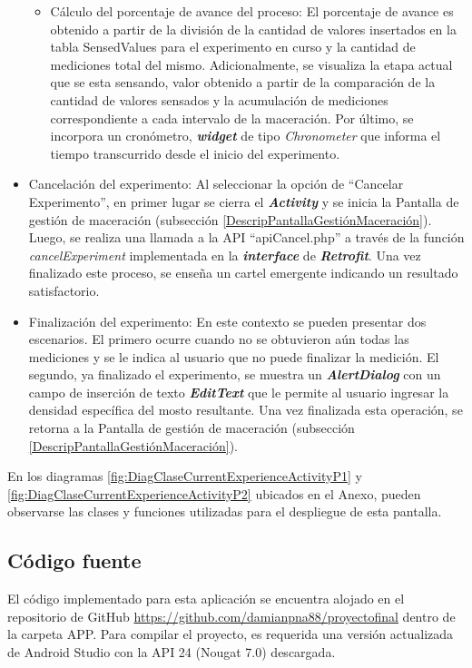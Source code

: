 \begin{itemize}
\begin{itemize}
                    \item Cálculo del porcentaje de avance del proceso: El porcentaje de avance es obtenido a partir de la división de la cantidad de valores insertados en la tabla SensedValues para el experimento en curso y la cantidad de mediciones total del mismo. Adicionalmente, se visualiza la etapa actual que se esta sensando, valor obtenido a partir de la comparación de la cantidad de valores sensados y la acumulación de mediciones correspondiente a cada intervalo de la maceración. Por último, se incorpora un cronómetro, \textbf{\textit{widget}} de tipo \textit{Chronometer} que informa el tiempo transcurrido desde el inicio del experimento.
                \end{itemize}
               
                \item Cancelación del experimento: Al seleccionar la opción de ``Cancelar Experimento'', en primer lugar se cierra el \textbf{\textit{\gls{Activity}}} y se inicia la Pantalla de gestión de maceración (subsección \ref{DescripPantallaGestiónMaceración}). Luego, se realiza una llamada a la API ``apiCancel.php'' a través de la función \textit{cancelExperiment} implementada en la \textbf{\textit{interface}} de \textbf{\textit{\gls{Retrofit}}}. Una vez finalizado este proceso, se enseña un cartel emergente indicando un resultado satisfactorio.
                
                \item Finalización del experimento: En este contexto se pueden presentar dos escenarios. El primero ocurre cuando no se obtuvieron aún todas las mediciones y se le indica al usuario que no puede finalizar la medición. El segundo, ya finalizado el experimento, se muestra un \textbf{\textit{\gls{AlertDialog}}} con un campo de inserción de texto \textbf{\textit{\gls{EditText}}} que le permite al usuario ingresar la densidad específica del mosto resultante. Una vez finalizada esta operación, se retorna a la Pantalla de gestión de maceración (subsección \ref{DescripPantallaGestiónMaceración}).
               
            \end{itemize}
             
            
            \par En los diagramas \ref{fig:DiagClaseCurrentExperienceActivityP1} y \ref{fig:DiagClaseCurrentExperienceActivityP2} ubicados en el Anexo, pueden observarse las clases y funciones utilizadas para el despliegue de esta pantalla.
            
    \subsection{Código fuente}
    \par El código implementado para esta aplicación se encuentra alojado en el repositorio de GitHub \url{https://github.com/damianpna88/proyectofinal} dentro de la carpeta APP. Para compilar el proyecto, es requerida una versión actualizada de Android Studio con la API 24 (Nougat 7.0) descargada.